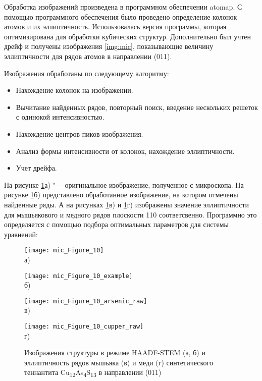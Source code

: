 Обработка изображений произведена в программном обеспечении atomap\cite{Nord2017}. С помощью программного обеспечения было проведено определение колонок атомов и их эллиптичность. Использовалась версия программы, которая оптимизирована для обработки кубических структур. Дополнительно был учтен дрейф и получены изображения \ref{img:mic}, показывающие величину эллиптичности для рядов атомов в направлении (011).

Изображения обработаны по следующему алгоритму:
\begin{itemize}
\item Нахождение колонок на изображении.

\item Вычитание найденных рядов, повторный поиск, введение нескольких решеток с одинокой интенсивностью.

\item Нахождение центров пиков изображения.

\item Анализ формы интенсивности от колонок, нахождение эллиптичности.

\item Учет дрейфа.
\end{itemize}

На рисунке \ref{img:mic1}а) "--- оригинальное изображение, полученное с микроскопа. На рисунке \ref{img:mic1}б) представлено обработанное изображение, на котором отмечены найденные ряды. А на рисунках \ref{img:mic1}в) и \ref{img:mic1}г) изображены значение эллиптичности для  мышьякового и медного рядов плоскости 110 соответсвенно.
Программно это определяется с помощью подбора оптимальных параметров для системы уравнений:
\begin{figure}[p!]
  \begin{minipage}[ht]{0.5\linewidth}\centering
    \texttt{[image: mic\_Figure\_10]} \\ а)
  \end{minipage}
  \hfill
  \begin{minipage}[ht]{0.5\linewidth}\centering
    \texttt{[image: mic\_Figure\_10\_example]} \\ б)
  \end{minipage}
\vfill
  \begin{minipage}[ht]{0.5\linewidth}\centering
    \texttt{[image: mic\_Figure\_10\_arsenic\_raw]} \\ в)
  \end{minipage}
  \hfill
  \begin{minipage}[ht]{0.5\linewidth}\centering
    \texttt{[image: mic\_Figure\_10\_cupper\_raw]} \\ г)
  \end{minipage}

      \caption[Изображения структуры в режиме HAADF-STEM (а, б) и эллиптичность рядов мышьяка (в) и меди (г) синтетического теннантита Cu\textsubscript{12}As\textsubscript{4}S\textsubscript{13} в направлении (011)]{Изображения структуры в режиме HAADF-STEM (а, б) и эллиптичность рядов мышьяка (в) и меди (г) синтетического теннантита Cu\textsubscript{12}As\textsubscript{4}S\textsubscript{13} в направлении (011)}
    \label{img:mic1}
\end{figure}

